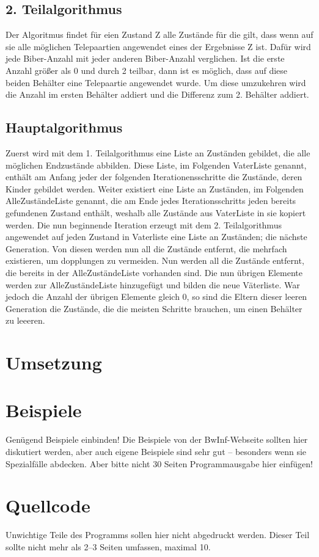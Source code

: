\documentclass[a4paper,10pt,ngerman]{scrartcl}
\begin{document}
\subsection{2. Teilalgorithmus}
Der Algoritmus findet für eien Zustand Z alle Zustände für die gilt, dass wenn auf sie alle möglichen Telepaartien angewendet eines der Ergebnisse Z ist. Dafür wird jede Biber-Anzahl mit jeder anderen Biber-Anzahl verglichen. Ist die erste Anzahl größer als 0 und durch 2 teilbar, dann ist es möglich, dass auf diese beiden Behälter eine Telepaartie angewendet wurde. Um diese umzukehren wird die Anzahl im ersten Behälter addiert und die Differenz zum 2. Behälter addiert.
\subsection{Hauptalgorithmus}
Zuerst wird mit dem 1. Teilalgorithmus eine Liste an Zuständen gebildet, die alle möglichen Endzustände abbilden. Diese Liste, im Folgenden VaterListe genannt, enthält am Anfang jeder der folgenden Iterationensschritte die Zustände, deren Kinder gebildet werden. Weiter existiert eine Liste an Zuständen, im Folgenden AlleZuständeListe genannt, die am Ende jedes Iterationsschritts jeden bereits gefundenen Zustand enthält, weshalb alle Zustände aus VaterListe in sie kopiert werden. Die nun beginnende Iteration erzeugt mit dem 2. Teilalgorithmus angewendet auf jeden Zustand in Vaterliste eine Liste an Zuständen; die nächste Generation. Von diesen werden nun all die Zustände entfernt, die mehrfach existieren, um dopplungen zu vermeiden. Nun werden all die Zustände entfernt, die bereits in der AlleZuständeListe vorhanden sind. Die nun übrigen Elemente werden zur AlleZuständeListe hinzugefügt und bilden die neue Väterliste. War jedoch die Anzahl der übrigen Elemente gleich 0, so sind die Eltern dieser leeren Generation die Zustände, die die meisten Schritte brauchen, um einen Behälter zu leeeren.
\section{Umsetzung}

\section{Beispiele}
Genügend Beispiele einbinden! Die Beispiele von der BwInf-Webseite sollten hier diskutiert werden, aber auch eigene Beispiele sind sehr gut – besonders wenn sie Spezialfälle abdecken. Aber bitte nicht 30 Seiten Programmausgabe hier einfügen!

\section{Quellcode}
Unwichtige Teile des Programms sollen hier nicht abgedruckt werden. Dieser Teil sollte nicht mehr als 2–3 Seiten umfassen, maximal 10.
\end{document}
